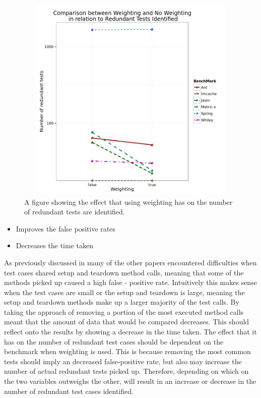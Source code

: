 \begin{figure}[h]
\begin{center}
\includegraphics[height=10cm, width = 14.5cm]{Weighting.png}
\end{center}
\caption{A figure showing the effect that using weighting has on the number of redundant tests are identified.}
\label{fig:weightgraph}
\end{figure}


\begin{itemize}
\item Improves the false positive rates
\item Decreases the time taken
\end{itemize}


As previously discussed in  many of the other papers encountered difficulties when test cases shared setup and teardown method calls, meaning that some of the methods picked up caused a high false - positive rate. Intuitively this makes sense when the test cases are small or the setup and teardown is large, meaning the setup and teardown methods make up a larger majority of the test calls. By taking the approach of removing a portion of the most executed method calls meant that the amount of data that would be compared decreases. This should reflect onto the results by showing a decrease in the time taken. The effect that it has on the number of redundant test cases should be dependent on the benchmark when weighting is used. This is because removing the most common tests should imply an decreased false-positive rate, but also may increase the number of actual redundant tests picked up. Therefore, depending on which on the two variables outweighs the other, will result in an increase or decrease in the number of redundant test cases identified.
